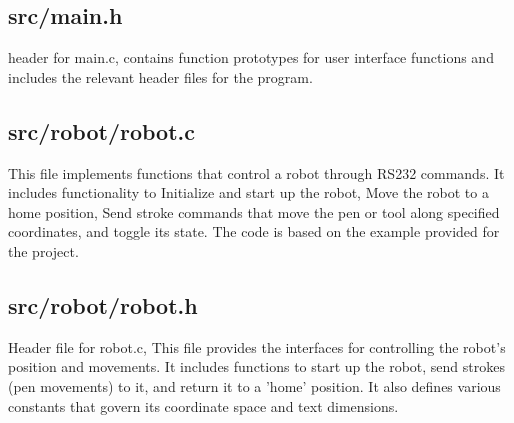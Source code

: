 \subsection{src/main.h}
header for main.c, contains function prototypes for user interface functions and includes the relevant header files for the program.

\subsection{src/robot/robot.c}
This file implements functions that control a robot through RS232 commands. It includes functionality to Initialize and start up the robot, Move the robot to a home position, Send stroke commands that move the pen or tool along specified coordinates, and toggle its state. The code is based on the example provided for the project.
\subsection{src/robot/robot.h}
Header file for robot.c, This file provides the interfaces for controlling the robot's position and movements. It includes functions to start up the robot, send strokes (pen movements) to it, and return it to a 'home' position. It also defines various constants that govern its coordinate space and text dimensions.






